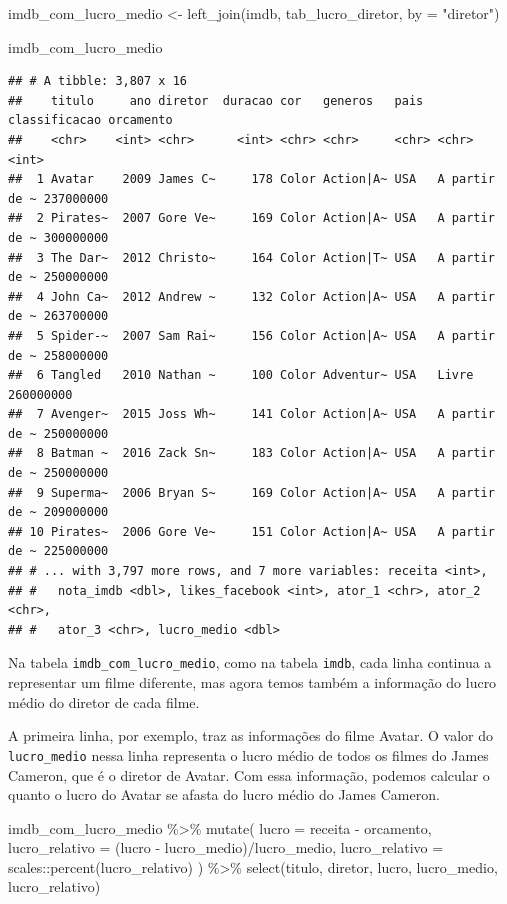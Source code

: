 \documentclass[
]{book}
\newenvironment{Shaded}{\begin{snugshade}}{\end{snugshade}}
\newcommand{\AttributeTok}[1]{\textcolor[rgb]{0.77,0.63,0.00}{#1}}
\newcommand{\FunctionTok}[1]{\textcolor[rgb]{0.00,0.00,0.00}{#1}}
\newcommand{\NormalTok}[1]{#1}
\newcommand{\OtherTok}[1]{\textcolor[rgb]{0.56,0.35,0.01}{#1}}
\newcommand{\SpecialCharTok}[1]{\textcolor[rgb]{0.00,0.00,0.00}{#1}}
\newcommand{\StringTok}[1]{\textcolor[rgb]{0.31,0.60,0.02}{#1}}
\begin{document}
\begin{Shaded}
\begin{Highlighting}[]
\NormalTok{imdb\_com\_lucro\_medio }\OtherTok{\textless{}{-}} \FunctionTok{left\_join}\NormalTok{(imdb, tab\_lucro\_diretor, }\AttributeTok{by =} \StringTok{"diretor"}\NormalTok{)}

\NormalTok{imdb\_com\_lucro\_medio}
\end{Highlighting}
\end{Shaded}

\begin{verbatim}
## # A tibble: 3,807 x 16
##    titulo     ano diretor  duracao cor   generos   pais  classificacao orcamento
##    <chr>    <int> <chr>      <int> <chr> <chr>     <chr> <chr>             <int>
##  1 Avatar    2009 James C~     178 Color Action|A~ USA   A partir de ~ 237000000
##  2 Pirates~  2007 Gore Ve~     169 Color Action|A~ USA   A partir de ~ 300000000
##  3 The Dar~  2012 Christo~     164 Color Action|T~ USA   A partir de ~ 250000000
##  4 John Ca~  2012 Andrew ~     132 Color Action|A~ USA   A partir de ~ 263700000
##  5 Spider-~  2007 Sam Rai~     156 Color Action|A~ USA   A partir de ~ 258000000
##  6 Tangled   2010 Nathan ~     100 Color Adventur~ USA   Livre         260000000
##  7 Avenger~  2015 Joss Wh~     141 Color Action|A~ USA   A partir de ~ 250000000
##  8 Batman ~  2016 Zack Sn~     183 Color Action|A~ USA   A partir de ~ 250000000
##  9 Superma~  2006 Bryan S~     169 Color Action|A~ USA   A partir de ~ 209000000
## 10 Pirates~  2006 Gore Ve~     151 Color Action|A~ USA   A partir de ~ 225000000
## # ... with 3,797 more rows, and 7 more variables: receita <int>,
## #   nota_imdb <dbl>, likes_facebook <int>, ator_1 <chr>, ator_2 <chr>,
## #   ator_3 <chr>, lucro_medio <dbl>
\end{verbatim}

Na tabela \texttt{imdb\_com\_lucro\_medio}, como na tabela \texttt{imdb}, cada linha continua a representar um filme diferente, mas agora temos também a informação do lucro médio do diretor de cada filme.

A primeira linha, por exemplo, traz as informações do filme Avatar. O valor do \texttt{lucro\_medio} nessa linha representa o lucro médio de todos os filmes do James Cameron, que é o diretor de Avatar. Com essa informação, podemos calcular o quanto o lucro do Avatar se afasta do lucro médio do James Cameron.

\begin{Shaded}
\begin{Highlighting}[]
\NormalTok{imdb\_com\_lucro\_medio }\SpecialCharTok{\%\textgreater{}\%} 
  \FunctionTok{mutate}\NormalTok{(}
    \AttributeTok{lucro =}\NormalTok{ receita }\SpecialCharTok{{-}}\NormalTok{ orcamento,}
    \AttributeTok{lucro\_relativo =}\NormalTok{ (lucro }\SpecialCharTok{{-}}\NormalTok{ lucro\_medio)}\SpecialCharTok{/}\NormalTok{lucro\_medio,}
    \AttributeTok{lucro\_relativo =}\NormalTok{ scales}\SpecialCharTok{::}\FunctionTok{percent}\NormalTok{(lucro\_relativo)}
\NormalTok{  ) }\SpecialCharTok{\%\textgreater{}\%} 
  \FunctionTok{select}\NormalTok{(titulo, diretor, lucro, lucro\_medio, lucro\_relativo)}
\end{Highlighting}
\end{Shaded}
\end{document}
